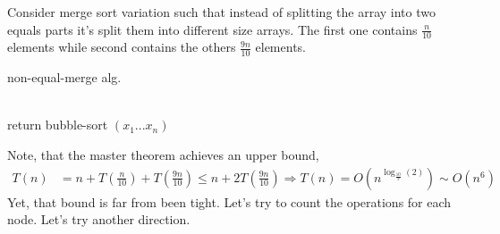 \begin{example}
Consider merge sort variation such that instead of splitting the array into two equals parts it's split them into different size arrays. The first one contains \( \frac{n}{10} \) elements while second contains the others \( \frac{9n}{10}\) elements.

\begin{algbox}{non-equal-merge alg.}
\begin{algorithm}[H]
\SetAlgoLined
{}
 \ \\ 
    { return bubble-sort \( (x_1 ... x_n)\) } 
 \ \\ 
 
\end{algorithm}
\end{algbox}
Note, that the master theorem achieves an upper bound, 
\begin{equation*}
    \begin{split}
        T\left(n\right) & = n +  T\left(\frac{n}{10}\right) + T\left(\frac{9n}{10}\right) \le n +  2 T\left(\frac{9n}{10}\right) \Rightarrow T\left(n\right) = O \left( n^{\log_{\frac{10}{9}}\left(2\right)} \right) \sim O \left( n^{ 6 } \right)  
    \end{split}
\end{equation*}
Yet, that bound is far from been tight. Let's try to count the operations for each node. Let's try another direction. 


\end{example}
